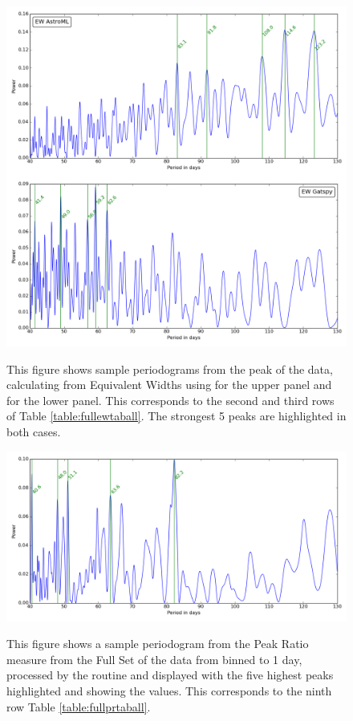 \begin{figure}[!htbp]
\begin{center}
\includegraphics[scale=0.20]{Figures/summpgrams.png} \\
\end{center}   
\caption{This figure shows sample periodograms from the {\ha} peak of the {\harps} data, calculating from Equivalent
  Widths using {\astroml} for the upper panel and {\gatspy} for the lower panel. This corresponds to the second and
  third rows of Table \ref{table:fullewtaball}. The strongest 5 peaks are highlighted in both cases.}
\protect\label{fig:harpspgrams1}
\end{figure}


\begin{figure}[!htbp]
\begin{center}
\includegraphics[scale=0.40]{Figures/harpsprbind1.png} \\
\end{center}   
\caption{This figure shows a sample periodogram from the Peak Ratio measure from the Full Set of the data from {\harps}
  binned to 1 day, processed by the {\gatspy} routine and displayed with the five highest peaks highlighted and showing
  the values. This corresponds to the ninth row Table \ref{table:fullprtaball}.}
\protect\label{fig:harpspgrams2}
\end{figure}

